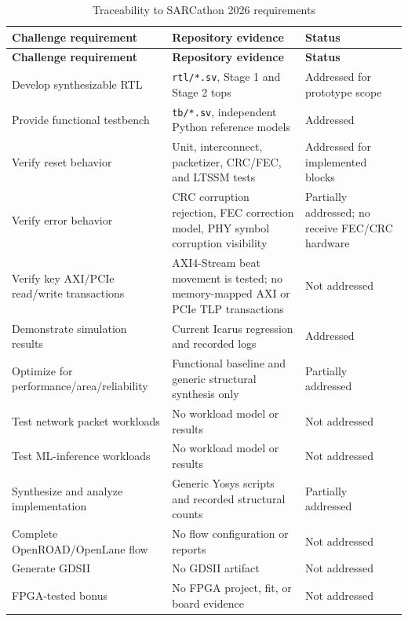 \documentclass[11pt,a4paper]{article}
\newcommand{\code}[1]{\texttt{#1}}
\begin{document}
\begin{longtable}{>{\raggedright\arraybackslash}p{} >{\raggedright\arraybackslash}p{} >{\raggedright\arraybackslash}p{}}
\caption{Traceability to SARCathon 2026 requirements}\\
\toprule
\textbf{Challenge requirement} & \textbf{Repository evidence} & \textbf{Status} \\
\midrule
\endfirsthead
\toprule
\textbf{Challenge requirement} & \textbf{Repository evidence} & \textbf{Status} \\
\midrule
\endhead
Develop synthesizable RTL & \code{rtl/*.sv}, Stage 1 and Stage 2 tops & Addressed for prototype scope \\
Provide functional testbench & \code{tb/*.sv}, independent Python reference models & Addressed \\
Verify reset behavior & Unit, interconnect, packetizer, CRC/FEC, and LTSSM tests & Addressed for implemented blocks \\
Verify error behavior & CRC corruption rejection, FEC correction model, PHY symbol corruption visibility & Partially addressed; no receive FEC/CRC hardware \\
Verify key AXI/PCIe read/write transactions & AXI4-Stream beat movement is tested; no memory-mapped AXI or PCIe TLP transactions & Not addressed \\
Demonstrate simulation results & Current Icarus regression and recorded logs & Addressed \\
Optimize for performance/area/reliability & Functional baseline and generic structural synthesis only & Partially addressed \\
Test network packet workloads & No workload model or results & Not addressed \\
Test ML-inference workloads & No workload model or results & Not addressed \\
Synthesize and analyze implementation & Generic Yosys scripts and recorded structural counts & Partially addressed \\
Complete OpenROAD/OpenLane flow & No flow configuration or reports & Not addressed \\
Generate GDSII & No GDSII artifact & Not addressed \\
FPGA-tested bonus & No FPGA project, fit, or board evidence & Not addressed \\
\bottomrule
\end{longtable}

\end{document}

